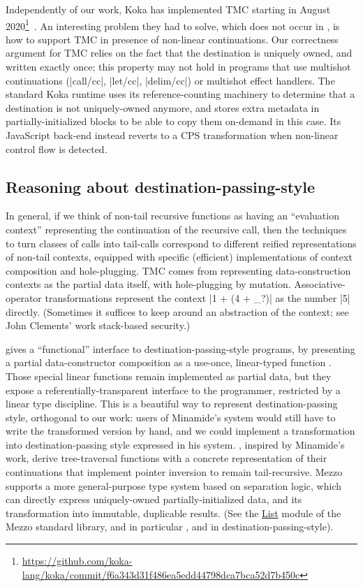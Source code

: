 Independently of our work, Koka has implemented TMC starting in August
2020\footnote{\url{https://github.com/koka-lang/koka/commit/f6a343d31f486ea5edd44798dca7bca52d7b450c}}~\citep*{tmc-koka-2023}.
An interesting problem they had to solve, which does not occur in \OCaml,
is how to support TMC in presence of non-linear continuations. Our
correctness argument for TMC relies on the fact that the destination
is uniquely owned, and written exactly once; this property may not
hold in programs that use multishot continuations (\ocaml|call/cc|,
\ocaml|let/cc|, \ocaml|delim/cc|) or multishot effect handlers. The standard Koka runtime uses its
reference-counting machinery to determine that a destination is not
uniquely-owned anymore, and stores extra metadata in
partially-initialized blocks to be able to copy them on-demand in this
case. Its JavaScript back-end instead reverts to a CPS transformation
when non-linear control flow is detected.

\subsection{Reasoning about destination-passing-style}

In general, if we think of non-tail recursive functions as having an ``evaluation context'' representing the continuation of the recursive call, then the techniques to turn classes of calls into tail-calls correspond to different reified representations of non-tail contexts, equipped with specific (efficient) implementations of context composition and hole-plugging.
TMC comes from representing data-construction contexts as the partial data itself, with hole-plugging by mutation.
Associative-operator transformations represent the context \ocaml|1 + (4 + _?)| as the number \ocaml|5| directly.
(Sometimes it suffices to keep around an abstraction of the context; see John Clements' work stack-based security.)

\citet*{minamide-98} gives a ``functional'' interface to destination-passing-style programs, by presenting a partial data-constructor composition  as a use-once, linear-typed function .
Those special linear functions remain implemented as partial data, but they expose a referentially-transparent interface to the programmer, restricted by a linear type discipline.
This is a beautiful way to represent destination-passing style, orthogonal to our work: users of Minamide's system would still have to write the transformed version by hand, and we could implement a transformation into destination-passing style expressed in his system.
\citet*{sobel-friedman-98}, inspired by Minamide's work, derive tree-traversal functions with a concrete representation of their continuations that implement pointer inversion to remain tail-recursive.
Mezzo~\citep*{mezzo-2016} supports a more general-purpose type system based on separation logic, which can directly express uniquely-owned partially-initialized data, and its transformation into immutable, duplicable results.
(See the \href{https://protz.github.io/mezzo/code_samples/list.mz.html}{List} module of the Mezzo standard library, and in particular ,  and  in destination-passing-style).

